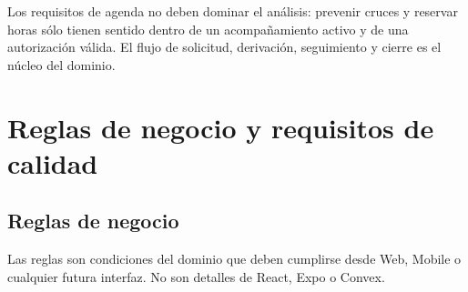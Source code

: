 \documentclass[10pt,a4paper,oneside]{article}
\begin{document}
Los requisitos de agenda no deben dominar el análisis: prevenir cruces y reservar horas sólo tienen sentido dentro de un acompañamiento activo y de una autorización válida. El flujo de solicitud, derivación, seguimiento y cierre es el núcleo del dominio.
\section{Reglas de negocio y requisitos de calidad}

\subsection{Reglas de negocio}

Las reglas son condiciones del dominio que deben cumplirse desde Web, Mobile o cualquier futura interfaz. No son detalles de React, Expo o Convex.
\end{document}
